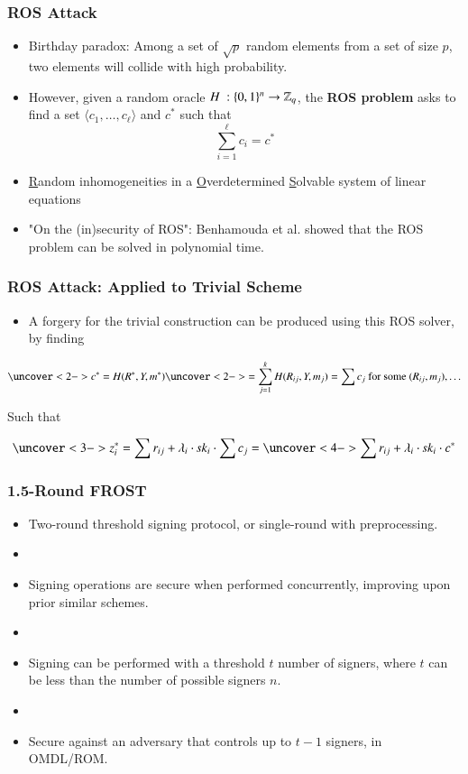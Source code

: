 \documentclass[hyperref={pdfpagelabels=true},table,dvipsnames,14pt,aspectratio=169]{beamer}
\begin{document}
\begin{frame}
  \frametitle{ROS Attack}

  \begin{itemize}
    \item<1-> Birthday paradox: Among a set of $\sqrt{p}$ random elements from a set of size $p$, two elements will collide with high probability. 
    \item<2-> However, given a random oracle $H\ : \{0,1 \}^n \rightarrow \mathbb{Z}_q$, the \textbf{ROS problem} asks to find a set $\langle c_1, \ldots, c_\ell \rangle$  and $c^*$ such that 
	    \[  \sum_{i=1}^\ell c_i = c^*  \]

    \item<3-> \underline{R}andom inhomogeneities in a \underline{O}verdetermined \underline{S}olvable system of linear equations
    \item<4-> "On the (in)security of ROS": Benhamouda et al. showed that the ROS problem can be solved in polynomial time. 
  \end{itemize}
\end{frame}


\begin{frame}
  \frametitle{ROS Attack: Applied to Trivial Scheme}

  \begin{itemize}
    \item<1-> A forgery for the trivial construction can be produced using this ROS solver, by finding 
  \end{itemize}
	\[ \uncover<2-> { c^*= H(R^*, Y, m^*) \uncover<2->{ = \sum_{j=1}^{k} H(R_{ij}, Y, m_j)  =
	\sum c_j  \text{ for some } (R_{ij}, m_j), \dots } } \]

	 { Such that}

	\[ \uncover<3-> {z_i^* = \sum r_{ij} + \lambda_i \cdot \sk_i \cdot \sum c_j} = \uncover<4->
	{ \sum r_{ij} + \lambda_i \cdot \sk_i \cdot c^*} \]
\end{frame}

\begin{frame}
  \frametitle{1.5-Round FROST}

  \begin{itemize}
    \item<1-> Two-round threshold signing protocol, or single-round with preprocessing.
    \item[]
    \item<2-> Signing operations are secure when performed concurrently,
      improving upon prior similar schemes.
    \item[]
    \item<3-> Signing can be performed with a threshold $t$ number of signers,
      where $t$ can be less than the number of possible signers $n$.
    \item[]
    \item<4-> Secure against an adversary that controls up to $t-1$ signers, in OMDL/ROM.
  \end{itemize}
\end{frame}
\end{document}
